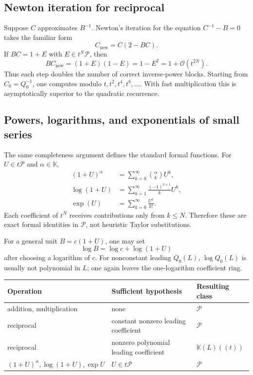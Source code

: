 \documentclass[11pt]{article}
\theoremstyle{pltheorem}
\newcommand{\K}{\mathbb K}
\newcommand{\PL}{\mathscr P}
\newcommand{\bigO}{\mathcal O}
\begin{document}
\subsection{Newton iteration for reciprocal}

Suppose \(C\) approximates \(B^{-1}\).  Newton's iteration for the equation
\(C^{-1}-B=0\) takes the familiar form
\begin{equation}\label{eq:newton-reciprocal}
 C_{\mathrm{new}}=C(2-BC).
\end{equation}
If
\(BC=1+E\) with \(E\in t^N\PL\), then
\begin{equation}\label{eq:newton-reciprocal-error}
 BC_{\mathrm{new}}=(1+E)(1-E)=1-E^2
 =1+\bigO(t^{2N}).
\end{equation}
Thus each step doubles the number of correct inverse-power blocks.  Starting from \(C_0=Q_0^{-1}\), one computes modulo \(t,t^2,t^4,t^8,\ldots\).  With fast multiplication this is asymptotically superior to the quadratic recurrence.

\subsection{Powers, logarithms, and exponentials of small series}

The same completeness argument defines the standard formal functions.  For
\(U\in t\PL\) and \(\alpha\in\K\),
\begin{align}
 (1+U)^\alpha
 &=\sum_{k=0}^{\infty}\binom{\alpha}{k}U^k,
 \label{eq:binomial-small}\\
 \log(1+U)
 &=\sum_{k=1}^{\infty}\frac{(-1)^{k+1}}{k}U^k,
 \label{eq:log-small}\\
 \exp(U)
 &=\sum_{k=0}^{\infty}\frac{U^k}{k!}.
 \label{eq:exp-small}
\end{align}
Each coefficient of \(t^N\) receives contributions only from \(k\le N\).  Therefore these are exact formal identities in \(\PL\), not heuristic Taylor substitutions.

For a general unit \(B=c(1+U)\), one may set
\[
 \log B=\log c+\log(1+U)
\]
after choosing a logarithm of \(c\).  For nonconstant leading \(Q_0(L)\), \(\log Q_0(L)\) is usually not polynomial in \(L\); one again leaves the one-logarithm coefficient ring.

\begin{keybox}
\begin{center}
\begin{tabular}{@{}lll@{}}
\toprule
Operation & Sufficient hypothesis & Resulting class\\
\midrule
addition, multiplication & none & \(\PL\)\\
reciprocal & constant nonzero leading coefficient & \(\PL\)\\
reciprocal & nonzero polynomial leading coefficient & \(\K(L)((t))\)\\
\((1+U)^\alpha,\log(1+U),\exp U\) & \(U\in t\PL\) & \(\PL\)\\
\bottomrule
\end{tabular}
\end{center}
\end{keybox}
\end{document}
